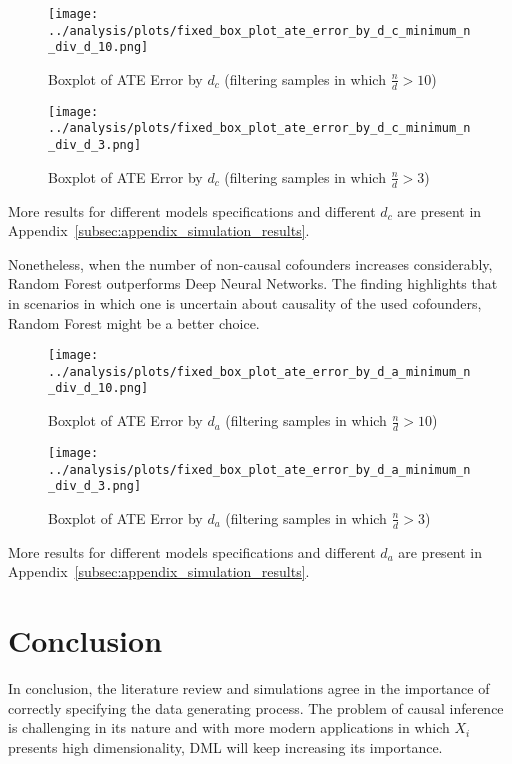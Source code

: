 \documentclass{article}
\numberwithin{equation}{section}
\begin{document}
\begin{figure}[H]
    \centering
    \texttt{[image: ../analysis/plots/fixed\_box\_plot\_ate\_error\_by\_d\_c\_minimum\_n\_div\_d\_10.png]}
    \caption{Boxplot of ATE Error by $d_c$ (filtering samples in which $\frac{n}{d} > 10$)}
\end{figure}

\begin{figure}[H]
    \centering
    \texttt{[image: ../analysis/plots/fixed\_box\_plot\_ate\_error\_by\_d\_c\_minimum\_n\_div\_d\_3.png]}
    \caption{Boxplot of ATE Error by $d_c$ (filtering samples in which $\frac{n}{d} > 3$)}
\end{figure}

More results for different models specifications and different $d_c$ are present in Appendix~\ref{subsec:appendix_simulation_results}.

Nonetheless, when the number of non-causal cofounders increases considerably, Random Forest outperforms Deep Neural Networks. The finding highlights that in scenarios in which one is uncertain about causality of the used cofounders, Random Forest might be a better choice.

\begin{figure}[H]
    \centering
    \texttt{[image: ../analysis/plots/fixed\_box\_plot\_ate\_error\_by\_d\_a\_minimum\_n\_div\_d\_10.png]}
    \caption{Boxplot of ATE Error by $d_a$ (filtering samples in which $\frac{n}{d} > 10$)}
\end{figure}

\begin{figure}[H]
    \centering
    \texttt{[image: ../analysis/plots/fixed\_box\_plot\_ate\_error\_by\_d\_a\_minimum\_n\_div\_d\_3.png]}
    \caption{Boxplot of ATE Error by $d_a$ (filtering samples in which $\frac{n}{d} > 3$)}
\end{figure}

More results for different models specifications and different $d_a$ are present in Appendix~\ref{subsec:appendix_simulation_results}.

\newpage
\section{Conclusion}

In conclusion, the literature review and simulations agree in the importance of correctly specifying the data generating process. The problem of causal inference is challenging in its nature and with more modern applications in which $X_i$ presents high dimensionality, DML will keep increasing its importance.
\end{document}
